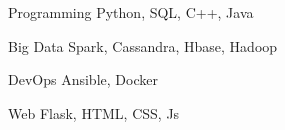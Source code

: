 


\begin{cvskills}


\cvskill
{Programming}
{Python, SQL, C++, Java}


\cvskill
{Big Data}
{Spark, Cassandra, Hbase, Hadoop}


\cvskill
{DevOps}
{Ansible, Docker}


\cvskill
{Web}
{Flask, HTML, CSS, Js}



\end{cvskills}